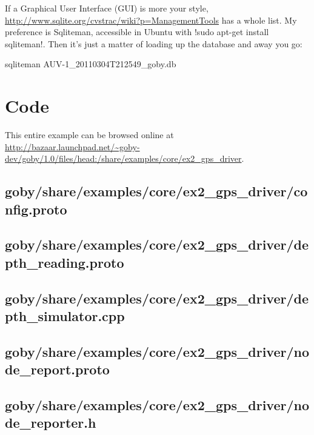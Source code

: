 If a Graphical User Interface (GUI) is more your style, \url{http://www.sqlite.org/cvstrac/wiki?p=ManagementTools} has a whole list. My preference is Sqliteman, accessible in Ubuntu with !sudo apt-get install sqliteman!. Then it's just a matter of loading up the database and away you go:
\begin{boxedverbatim}
sqliteman AUV-1_20110304T212549_goby.db
\end{boxedverbatim}
\resetbvlinenumber

\section{Code} \label{sec:gps_driver_example_code}

This entire example can be browsed online at \url{http://bazaar.launchpad.net/~goby-dev/goby/1.0/files/head:/share/examples/core/ex2_gps_driver}.

\subsection{goby/share/examples/core/ex2\_gps\_driver/config.proto} \label{sec:gps_driver:config.proto}
\resetbvlinenumber

\subsection{goby/share/examples/core/ex2\_gps\_driver/depth\_reading.proto} \label{sec:gps_driver:depth_reading.proto}
\resetbvlinenumber

\subsection{goby/share/examples/core/ex2\_gps\_driver/depth\_simulator.cpp} \label{sec:gps_driver:depth_simulator.cpp}
\resetbvlinenumber

\subsection{goby/share/examples/core/ex2\_gps\_driver/node\_report.proto} \label{sec:gps_driver:node_report.proto}
\resetbvlinenumber


\subsection{goby/share/examples/core/ex2\_gps\_driver/node\_reporter.h} \label{sec:gps_driver:node_reporter.h}
\resetbvlinenumber


